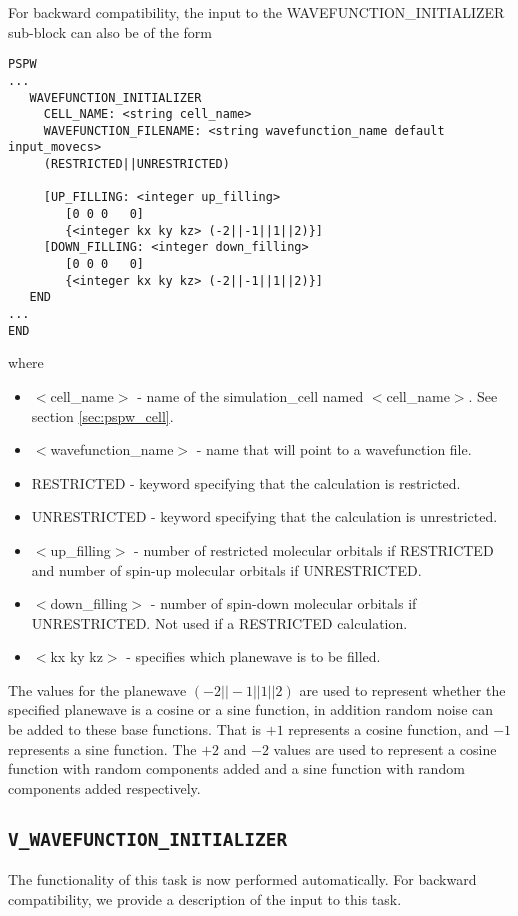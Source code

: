 For backward compatibility, the input to the WAVEFUNCTION\_INITIALIZER 
sub-block can also be of the form
\begin{verbatim}
PSPW
... 
   WAVEFUNCTION_INITIALIZER
     CELL_NAME: <string cell_name>
     WAVEFUNCTION_FILENAME: <string wavefunction_name default input_movecs>
     (RESTRICTED||UNRESTRICTED)
     
     [UP_FILLING: <integer up_filling>
        [0 0 0   0]
        {<integer kx ky kz> (-2||-1||1||2)}]
     [DOWN_FILLING: <integer down_filling>
        [0 0 0   0]
        {<integer kx ky kz> (-2||-1||1||2)}]
   END
...
END
\end{verbatim}
where
\begin{itemize}
        \item $<$cell\_name$>$ - name of the
                simulation\_cell named $<$cell\_name$>$.  See section \ref{sec:pspw_cell}.
        \item $<$wavefunction\_name$>$ - name that will point
              to a wavefunction file.
        \item RESTRICTED - keyword specifying that the calculation is restricted.
        \item UNRESTRICTED - keyword specifying that the calculation is unrestricted.
        \item $<$up\_filling$>$ - number of restricted molecular orbitals if
              RESTRICTED and number of spin-up molecular orbitals if 
              UNRESTRICTED.
        \item $<$down\_filling$>$ - number of spin-down molecular orbitals if
              UNRESTRICTED.  Not used if a RESTRICTED calculation.
        \item $<$kx ky kz$>$ - specifies which planewave is to be filled. 
\end{itemize}

The values for the planewave $(-2||-1||1||2)$ are used to represent whether
the specified planewave is a cosine or a sine function, in addition
random noise can be added to these base functions. That is $+1$ 
represents a cosine function, and $-1$ represents a sine function.
The $+2$ and $-2$ values are used to represent a cosine function with
random components added and a sine function with random components
added respectively.  


\subsection{\tt V\_WAVEFUNCTION\_INITIALIZER}
\label{sec:pspw_v_wavefunction_initializer}
The functionality of this task is now performed automatically. For backward 
compatibility, we provide a description of the input to this task.

